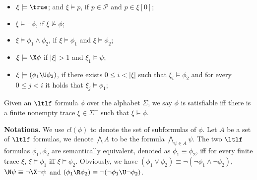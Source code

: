\begin{itemize}%
  \item $\xi\models\true$; and $\xi\models p$, if $p\in\mathcal{P}$ and $p\in\xi[0]$;
  \item $\xi\models\neg\phi$, if $\xi\not\models\phi$;
  \item $\xi\models\phi_1\wedge\phi_2$,  if $\xi\models\phi_1$ and $\xi\models\phi_2$;
  \item $\xi\models \X\phi$ if $|\xi|>1$ and $\xi_1\models\psi$;
  \item $\xi\models (\phi_1 \U\phi_2)$, if there exists $0\leq i < |\xi|$
  such that $\xi_i\models\phi_2$ and for every $0\leq j < i$ it holds that $\xi_j\models\phi_1$;
  \end{itemize}


\begin{definition}
Given an $\ltlf$ formula $\phi$ over the alphabet $\Sigma$,
we say $\phi$ is satisfiable iff there is a finite nonempty trace
$\xi\in\Sigma^+$ such that $\xi\models\phi$.
\end{definition}

\noindent\textbf{Notations.}
We use $cl(\phi)$ to denote the set of subformulas of $\phi$. 
Let $A$ be a set of $\ltlf$ formulas, we denote $\bigwedge A$ to be the formula $\bigwedge_{\psi\in A}\psi$.
The two $\ltlf$ formulas $\phi_1,\phi_2$ are semantically equivalent, denoted as $\phi_1\equiv\phi_2 $, iff for every finite trace $\xi$, $\xi\models\phi_1$ iff $\xi\models\phi_2$.  Obviously, we have $(\phi_1\vee\phi_2)\equiv \neg (\neg\phi_1 \wedge\neg \phi_2)$, 
$\N\psi\equiv \neg \X\neg\psi$ and $(\phi_1 \R\phi_2)\equiv \neg (\neg\phi_1 \U\neg \phi_2)$.

